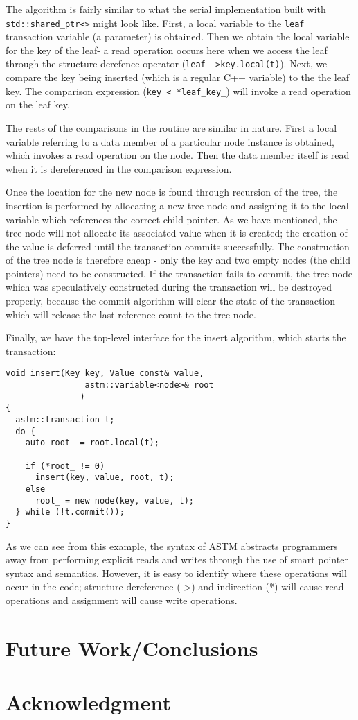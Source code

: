 \documentclass[conference]{IEEEtran}
\begin{document}
The algorithm is fairly similar to what the serial implementation built with \lstinline$std::shared_ptr<>$ might look like. First, a local variable to the \lstinline$leaf$ transaction variable (a parameter) is obtained. Then we obtain the local variable for the key of the leaf- a read operation occurs here when we access the leaf through the structure derefence operator (\lstinline$leaf_->key.local(t)$). Next, we compare the key being inserted (which is a regular C++ variable) to the the leaf key. The comparison expression (\lstinline$key < *leaf_key_$) will invoke a read operation on the leaf key.

The rests of the comparisons in the routine are similar in nature. First a local variable referring to a data member of a particular node instance is obtained, which invokes a read operation on the node. Then the data member itself is read when it is dereferenced in the comparison expression. 

Once the location for the new node is found through recursion of the tree, the insertion is performed by allocating a new tree node and assigning it to the local variable which references the correct child pointer. As we have mentioned, the tree node will not allocate its associated value when it is created; the creation of the value is deferred until the transaction commits successfully. The construction of the tree node is therefore cheap - only the key and two empty nodes (the child pointers) need to be constructed. If the transaction fails to commit, the tree node which was speculatively constructed during the transaction will be destroyed properly, because the commit algorithm will clear the state of the transaction which will release the last reference count to the  tree node.

Finally, we have the top-level interface for the insert algorithm, which starts the transaction:

\begin{lstlisting}
void insert(Key key, Value const& value,
                astm::variable<node>& root
               )
{
  astm::transaction t;
  do {
    auto root_ = root.local(t);

    if (*root_ != 0)
      insert(key, value, root, t);
    else
      root_ = new node(key, value, t);
  } while (!t.commit());
}
\end{lstlisting}

As we can see from this example, the syntax of ASTM abstracts programmers away from performing explicit reads and writes through the use of smart pointer syntax and semantics. However, it is easy to identify where these operations will occur in the code; structure dereference (->) and indirection (*) will cause read operations and assignment will cause write operations.

\section{Future Work/Conclusions}

\section*{Acknowledgment}

%
%

\end{document}
